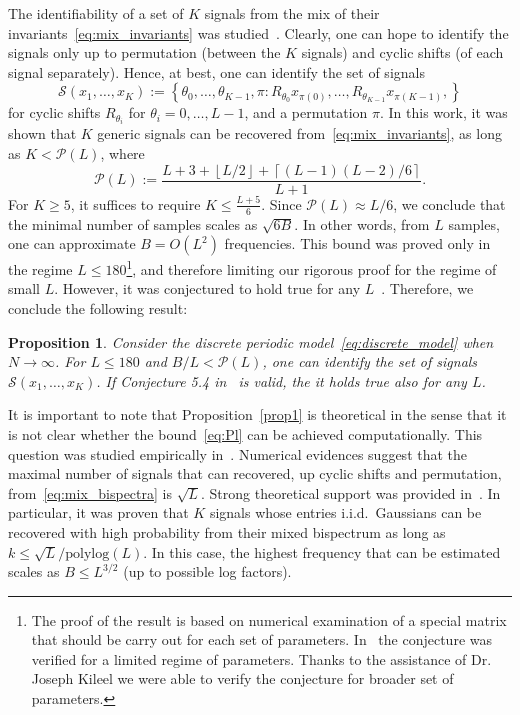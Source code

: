 \documentclass[english,12pt]{article}
\newcommand{\TODO}[1]{{\color{red}{[#1]}}}
\numberwithin{equation}{section}
\numberwithin{thm}{section} %
\newtheorem{prop}[thm]{Proposition}
\begin{document}
The identifiability of a set of $K$ signals from the mix of their  invariants~\eqref{eq:mix_invariants} was studied~\cite{bandeira2017estimation}.
Clearly, one can hope to identify the signals only up  to permutation (between the $K$ signals) and cyclic shifts (of each signal separately). 
Hence, at best, one can identify the set of signals  
\begin{equation} \label{eq:setS}
\mathcal{S}(x_1,\ldots,x_K):=\left\{ \theta_0,\ldots,\theta_{K-1},\pi : R_{\theta_0}x_{\pi(0)}, \ldots,R_{\theta_{K-1}}x_{\pi(K-1)},
\right\}
\end{equation}
for cyclic shifts $R_{\theta_i}$ for $\theta_i=0,\ldots,L-1$, and a permutation $\pi$.
In this work, it was shown that $K$ generic signals can be recovered from~\eqref{eq:mix_invariants},  as long as $K<\mathcal{P}(L)$, where
\begin{equation} \label{eq:Pl}
\mathcal{P}(L) := \frac{L+3+\left\lfloor L/2\right\rfloor +  \left\lceil (L-1)(L-2)/6\right\rceil}{L+1}.
\end{equation}
For $K\geq 5$, it suffices to require $K\leq \frac{L+5}{6}$. 
Since $\mathcal{P}(L) \approx L/6$, we conclude that the minimal number of samples scales as $\sqrt{6B}$. In other words, from $L$ samples, one can approximate  $B=O(L^2)$ frequencies. 
This bound was proved only in the regime $L\leq 180$\footnote{The proof of the result is based on numerical examination of a special matrix that should be carry out for each set of parameters. In~\cite{bandeira2017estimation} the conjecture was verified for a limited regime of parameters. Thanks to the assistance of Dr. Joseph Kileel we were able to verify the conjecture for broader set of parameters.}, and therefore limiting our rigorous proof for the regime of small $L$. 
However, it was conjectured  to hold true for any $L$~\cite[Conjecture 5.4]{bandeira2017estimation}.
Therefore, we conclude the following result:
\begin{prop} \label{prop1}
Consider the  discrete periodic model~\eqref{eq:discrete_model} when $N\to\infty$. 
For $L\leq 180$ and  $B/L<\mathcal{P}(L)$, one can identify the set of signals $\mathcal{S}(x_1,\ldots,x_K)$.
If Conjecture 5.4 in~\cite{bandeira2017estimation} is valid, the it holds true also for any $L$.
\end{prop}	

It is important to note that Proposition~\eqref{prop1} is theoretical in the sense that it is not clear whether the bound~\eqref{eq:Pl} can be achieved computationally.  
This question was studied empirically in~\cite{boumal2018heterogeneous}. Numerical evidences suggest that the maximal number of signals that can recovered, up cyclic shifts and permutation, from~\eqref{eq:mix_bispectra} is $\sqrt{L}$. 
Strong theoretical support was provided in~\cite{weinthesis}. In particular,  it was proven that $K$ signals whose entries i.i.d.\ Gaussians can be recovered with high probability from their mixed bispectrum as long as $k\leq \sqrt{L}/\text{polylog}(L)$.
In this case, the highest frequency that can be estimated scales as $B\leq L^{3/2}$ (up to possible log factors). 
\TODO{This is true for signals with white spectrum... for our case the bound seems smaller since the signals are smooth}
\end{document}
